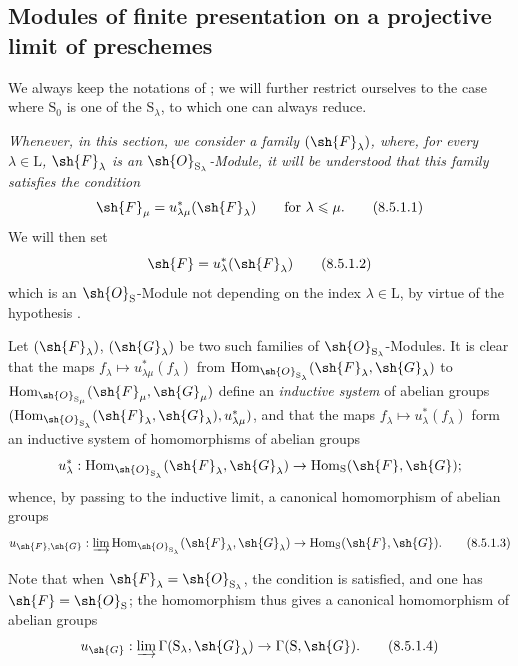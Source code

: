 \subsection{Modules of finite presentation on a projective limit of preschemes}
\label{subsection:IV.8.5}

\begin{env}[8.5.1]
\label{IV.8.5.1}
We always keep the notations of ; we will further restrict ourselves to the case where $\mathrm{S}_0$ is one of the $\mathrm{S}_\lambda$, to which one can always reduce.

\emph{Whenever, in this section, we consider a family $(\sh{F}_\lambda)$, where, for every $\lambda\in\mathrm{L}$, $\sh{F}_\lambda$ is an $\sh{O}_{\mathrm{S}_\lambda}$-Module, it will be understood that this family satisfies the condition}
\begin{equation}
  \sh{F}_\mu=u_{\lambda\mu}^*(\sh{F}_\lambda) \qquad\text{for }\lambda\leqslant\mu.
  \tag{8.5.1.1}
\label{IV.8.5.1.1}
\end{equation}
We will then set
\begin{equation}
  \sh{F}=u_\lambda^*(\sh{F}_\lambda)
  \label{IV.8.5.1.2}
\tag{8.5.1.2}
\end{equation}
which is an $\sh{O}_\mathrm{S}$-Module not depending on the index $\lambda\in\mathrm{L}$, by virtue of the hypothesis .

Let $(\sh{F}_\lambda)$, $(\sh{G}_\lambda)$ be two such families of $\sh{O}_{\mathrm{S}_\lambda}$-Modules.
It is clear that the maps $f_\lambda\mapsto u_{\lambda\mu}^*(f_\lambda)$ from $\operatorname{Hom}_{\sh{O}_{\mathrm{S}_\lambda}}(\sh{F}_\lambda,\sh{G}_\lambda)$ to $\operatorname{Hom}_{\sh{O}_{\mathrm{S}_\mu}}(\sh{F}_\mu,\sh{G}_\mu)$ define an \emph{inductive system} of abelian groups $(\operatorname{Hom}_{\sh{O}_{\mathrm{S}_\lambda}}(\sh{F}_\lambda,\sh{G}_\lambda),u_{\lambda\mu}^*)$, and that the maps $f_\lambda\mapsto u_\lambda^*(f_\lambda)$ form an inductive system of homomorphisms of abelian groups
\[
  u_\lambda^*:\operatorname{Hom}_{\sh{O}_{\mathrm{S}_\lambda}}(\sh{F}_\lambda,\sh{G}_\lambda)\to\operatorname{Hom}_\mathrm{S}(\sh{F},\sh{G});
\]
whence, by passing to the inductive limit, a canonical homomorphism of abelian groups
\begin{equation}
  u_{\sh{F},\sh{G}}:\varinjlim\operatorname{Hom}_{\sh{O}_{\mathrm{S}_\lambda}}(\sh{F}_\lambda,\sh{G}_\lambda)\to\operatorname{Hom}_\mathrm{S}(\sh{F},\sh{G}).
  \tag{8.5.1.3}
\label{IV.8.5.1.3}
\end{equation}

Note that when $\sh{F}_\lambda=\sh{O}_{\mathrm{S}_\lambda}$, the condition  is satisfied, and one has $\sh{F}=\sh{O}_\mathrm{S}$; the homomorphism  thus gives  a canonical homomorphism of abelian groups
\begin{equation}
  u_{\sh{G}}:\varinjlim\Gamma(\mathrm{S}_\lambda,\sh{G}_\lambda)\to\Gamma(\mathrm{S},\sh{G}).
  \tag{8.5.1.4}
\label{IV.8.5.1.4}
\end{equation}
\end{env}


